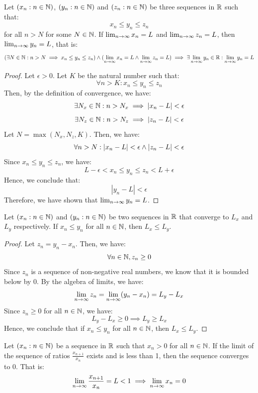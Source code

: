 \documentclass[openany]{book}
\begin{document}
\begin{mytheorem}
    Let $(x_n : n \in \mathbb{N})$, $(y_n : n \in \mathbb{N})$ and $(z_n : n \in \mathbb{N})$ be three sequences in $\mathbb{R}$ such that:
    $$x_n \leq y_n \leq z_n$$
    for all $n > N$ for some $N \in \mathbb{N}$. If $\lim_{n \to \infty} x_n = L$ and $\lim_{n \to \infty} z_n = L$, then $\lim_{n \to \infty} y_n = L$, that is: 
    $$(\exists N \in \mathbb{N}: n > N \implies x_n \leq y_n \leq z_n) \wedge (\lim_{n \to \infty} x_n = L \wedge \lim_{n \to \infty} z_n = L) \implies \exists \lim_{n \to \infty} y_n \in \mathbb{R} : \lim_{n \to \infty} y_n = L$$
\end{mytheorem}
\begin{proof}
    Let $\epsilon > 0$. Let $K$ be the natural number such that: 
    $$\forall n > K: x_n \leq y_n \leq z_n$$
    Then, by the definition of convergence, we have:
    $$\exists N_x \in \mathbb{N}: n > N_x \implies |x_n - L| < \epsilon$$
    $$\exists N_z \in \mathbb{N}: n > N_z \implies |z_n - L| < \epsilon$$
    Let $N = \max(N_x, N_z, K)$. Then, we have:
    $$\forall n > N: |x_n - L| < \epsilon \wedge |z_n - L| < \epsilon$$
    Since $x_n \leq y_n \leq z_n$, we have:
    $$L - \epsilon < x_n \leq y_n \leq z_n < L + \epsilon$$
    Hence, we conclude that:
    $$|y_n - L| < \epsilon$$
    Therefore, we have shown that $\lim_{n \to \infty} y_n = L$.
\end{proof}
\begin{mytheorem}
    Let $(x_n : n \in \mathbb{N})$ and $(y_n : n \in \mathbb{N})$ be two sequences in $\mathbb{R}$ that converge to $L_x$ and $L_y$ respectively. If $x_n \leq y_n$ for all $n \in \mathbb{N}$, then $L_x \leq L_y$.
\end{mytheorem}
\begin{proof}
    Let $z_n = y_n - x_n$. Then, we have:
    $$\forall n \in \mathbb{N}, z_n \geq 0$$
    Since $z_n$ is a sequence of non-negative real numbers, we know that it is bounded below by 0. By the algebra of limits, we have:
    $$\lim_{n \to \infty} z_n = \lim_{n \to \infty} (y_n - x_n) = L_y - L_x$$
    Since $z_n \geq 0$ for all $n \in \mathbb{N}$, we have:
    $$L_y - L_x \geq 0 \implies L_y \geq L_x$$
    Hence, we conclude that if $x_n \leq y_n$ for all $n \in \mathbb{N}$, then $L_x \leq L_y$.
\end{proof}
\begin{mytheorem}
    Let $(x_n : n \in \mathbb{N})$ be a sequence in $\mathbb{R}$ such that $x_n > 0$ for all $n \in \mathbb{N}$. If the limit of the sequence of ratios $\frac{x_{n+1}}{x_n}$ exists and is less than 1, then the sequence converges to 0. That is:
    $$\lim_{n \to \infty} \frac{x_{n+1}}{x_n} = L < 1 \implies \lim_{n \to \infty} x_n = 0$$
\end{mytheorem}
\end{document}
